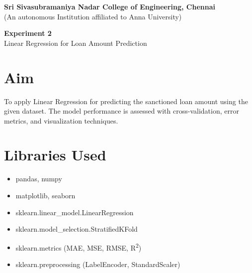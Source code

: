 \documentclass[11pt]{article}
\begin{document}
\begin{center}
    \large \textbf{Sri Sivasubramaniya Nadar College of Engineering, Chennai} \\
    (An autonomous Institution affiliated to Anna University) \\
    \vspace{0.3cm}
\end{center}

\begin{table}[!h]
\renewcommand{\arraystretch}{1.5}
\end{table}

\begin{center}
 \LARGE \textbf{Experiment 2} \\
 \large Linear Regression for Loan Amount Prediction
\end{center}

\section*{Aim}
To apply Linear Regression for predicting the sanctioned loan amount using the given dataset. The model performance is assessed with cross-validation, error metrics, and visualization techniques.

\section*{Libraries Used}
\begin{itemize}
  \item pandas, numpy
  \item matplotlib, seaborn
  \item sklearn.linear\_model.LinearRegression
  \item sklearn.model\_selection.StratifiedKFold
  \item sklearn.metrics (MAE, MSE, RMSE, R\textsuperscript{2})
  \item sklearn.preprocessing (LabelEncoder, StandardScaler)
\end{itemize}
\end{document}

